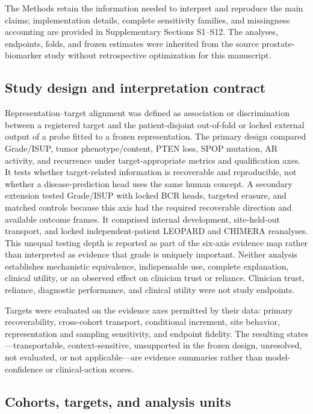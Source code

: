 The Methods retain the information needed to interpret and reproduce the main claims;
implementation details, complete sensitivity families, and missingness accounting are
provided in Supplementary Sections S1--S12. The analyses, endpoints, folds, and frozen
estimates were inherited from the source prostate-biomarker study without retrospective
optimization for this manuscript.

\subsection{Study design and interpretation contract}

Representation--target alignment was defined as association or discrimination between a
registered target and the patient-disjoint out-of-fold or locked external output of a probe
fitted to a frozen representation. The primary design compared Grade/ISUP, tumor
phenotype/content, PTEN loss, SPOP mutation, AR activity, and recurrence under
target-appropriate metrics and qualification axes. It tests whether target-related
information is recoverable and reproducible, not whether a disease-prediction head uses the
same human concept. A secondary extension tested Grade/ISUP with locked BCR heads, targeted
erasure, and matched controls because this axis had the required recoverable direction and
available outcome frames. It comprised internal development, site-held-out transport, and
locked independent-patient LEOPARD and CHIMERA reanalyses. This unequal testing depth is reported as part of the
six-axis evidence map rather than interpreted as evidence that grade is uniquely important.
Neither analysis establishes mechanistic equivalence, indispensable use, complete
explanation, clinical utility, or an observed effect on clinician trust or reliance.
Clinician trust, reliance, diagnostic performance, and clinical utility were not study
endpoints.

Targets were evaluated on the evidence axes permitted by their data: primary recoverability,
cross-cohort transport, conditional increment, site behavior, representation and sampling
sensitivity, and endpoint fidelity. The resulting states---transportable,
context-sensitive, unsupported in the frozen design, unresolved, not evaluated, or not
applicable---are evidence summaries rather than model-confidence or clinical-action scores.

\subsection{Cohorts, targets, and analysis units}

